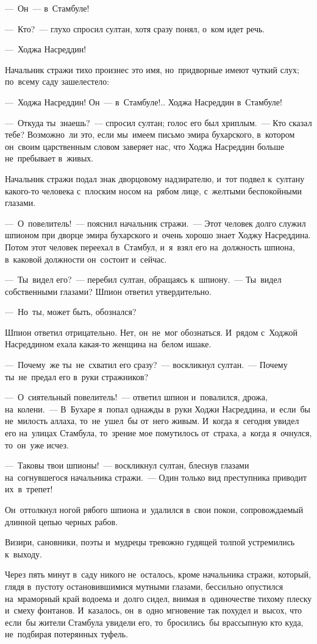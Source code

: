 \documentclass[12pt,a4paper]{book}
\begin{document}
—~Он~— в~Стамбуле!

—~Кто?~— глухо спросил султан, хотя сразу понял, о~ком идет речь.

—~Ходжа Насреддин!

Начальник стражи тихо произнес это имя, но~придворные имеют чуткий слух; по~всему саду зашелестело:

—~Ходжа Насреддин! Он~— в~Стамбуле!.. Ходжа Насреддин в~Стамбуле!

—~Откуда ты~знаешь?~— спросил султан; голос его был хриплым.~— Кто сказал тебе? Возможно~ли это, если мы~имеем письмо эмира бухарского, в~котором он~своим царственным словом заверяет нас, что Ходжа Насреддин больше не~пребывает в~живых.

Начальник стражи подал знак дворцовому надзирателю, и~тот подвел к~султану какого-то человека с~плоским носом на~рябом лице, с~желтыми беспокойными глазами.

—~О~повелитель!~— пояснил начальник стражи.~— Этот человек долго служил шпионом при дворце эмира бухарского и~очень хорошо знает Ходжу Насреддина. Потом этот человек переехал в~Стамбул, и~я~взял его на~должность шпиона, в~каковой должности он~состоит и~сейчас.

—~Ты~видел его?~— перебил султан, обращаясь к~шпиону.~— Ты~видел собственными глазами? Шпион ответил утвердительно.

—~Но~ты, может быть, обознался?

Шпион ответил отрицательно. Нет, он~не~мог обознаться. И~рядом с~Ходжой Насреддином ехала какая-то женщина на~белом ишаке.

—~Почему~же ты~не~схватил его сразу?~— воскликнул султан.~— Поче\-му ты~не~предал его в~руки стражников?

—~О~сиятельный повелитель!~— ответил шпион и~повалился, дрожа, на~колени.~— В~Бухаре я~попал однажды в~руки Ходжи Насреддина, и~если~бы не~милость аллаха, то~не~ушел~бы от~него живым. И~когда я~сегодня увидел его на~улицах Стамбула, то~зрение мое помутилось от~страха, а~когда я~очнулся, то~он~уже исчез.

—~Таковы твои шпионы!~— воскликнул султан, блеснув глазами на~согнувшегося начальника стражи.~— Один только вид преступника приводит их~в~трепет!

Он~оттолкнул ногой рябого шпиона и~удалился в~свои покои, сопровождаемый длинной цепью черных рабов.

Визири, сановники, поэты и~мудрецы тревожно гудящей толпой устремились к~выходу.

Через пять минут в~саду никого не~осталось, кроме начальника стражи, который, глядя в~пустоту остановившимися мутными глазами, бессильно опустился на~мраморный край водоема и~долго сидел, внимая в~одиночестве тихому плеску и~смеху фонтанов. И~казалось, он~в~одно мгновение так похудел и~высох, что если~бы жители Стамбула увидели его, то~бросились~бы врассыпную кто куда, не~подбирая потерянных туфель.
\end{document}
